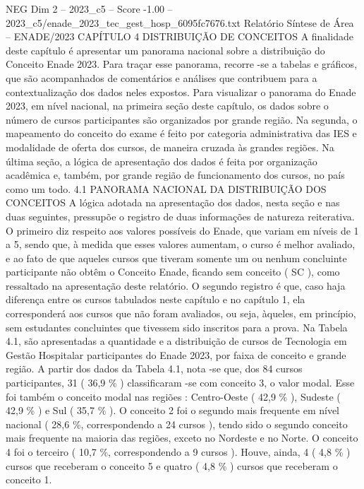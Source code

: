 \begin{textsample}{NEG Dim 2 – 2023\_c5 – Score -1.00 – 2023\_c5/enade\_2023\_tec\_gest\_hosp\_6095fc7676.txt}  \label{ex:f2_neg_174}
Relatório Síntese de Área – ENADE/2023 CAPÍTULO 4 DISTRIBUIÇÃO DE CONCEITOS A finalidade deste capítulo é apresentar um panorama nacional sobre a distribuição do Conceito Enade 2023.
Para traçar esse panorama, recorre -se a tabelas e gráficos, que são acompanhados de comentários e análises que contribuem para a contextualização dos dados neles expostos.
Para visualizar o panorama do Enade 2023, em nível nacional, na primeira seção deste capítulo, os dados sobre o número de cursos participantes são organizados por grande região.
Na segunda, o mapeamento do conceito do exame é feito por categoria administrativa das IES e modalidade de oferta dos cursos, de maneira cruzada às grandes regiões.
Na última seção, a lógica de apresentação dos dados é feita por organização acadêmica e, também, por grande região de funcionamento dos cursos, no país como um todo. 4.1 PANORAMA NACIONAL DA DISTRIBUIÇÃO DOS CONCEITOS A lógica adotada na apresentação dos dados, nesta seção e nas duas seguintes, pressupõe o registro de duas informações de natureza reiterativa.
O primeiro diz respeito aos valores possíveis do Enade, que variam em níveis de 1 a 5, sendo que, à medida que esses valores aumentam, o curso é melhor avaliado, e ao fato de que aqueles cursos que tiveram somente um ou nenhum concluinte participante não obtêm o Conceito Enade, ficando sem conceito ( SC ), como ressaltado na apresentação deste relatório.
O segundo registro é que, caso haja diferença entre os cursos tabulados neste capítulo e no capítulo 1, ela corresponderá aos cursos que não foram avaliados, ou seja, àqueles, em princípio, sem estudantes concluintes que tivessem sido inscritos para a prova.
Na Tabela 4.1, são apresentadas a quantidade e a distribuição de cursos de Tecnologia em Gestão Hospitalar participantes do Enade 2023, por faixa de conceito e grande região.
A partir dos dados da Tabela 4.1, nota -se que, dos 84 cursos participantes, 31 ( 36,9 \% ) classificaram -se com conceito 3, o valor modal.
Esse foi também o conceito modal nas regiões : Centro-Oeste ( 42,9 \% ), Sudeste ( 42,9 \% ) e Sul ( 35,7 \% ).
O conceito 2 foi o segundo mais frequente em nível nacional ( 28,6 \%, correspondendo a 24 cursos ), tendo sido o segundo conceito mais frequente na maioria das regiões, exceto no Nordeste e no Norte.
O conceito 4 foi o terceiro ( 10,7 \%, correspondendo a 9 cursos ).
Houve, ainda, 4 ( 4,8 \% ) cursos que receberam o conceito 5 e quatro ( 4,8 \% ) cursos que receberam o conceito 1.

\end{textsample}
